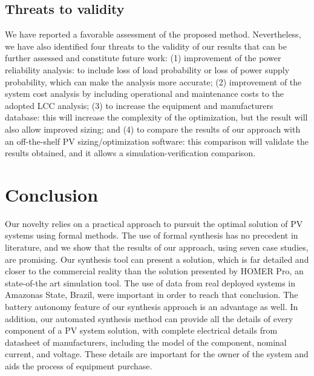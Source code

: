 \documentclass[runningheads]{llncs}
\begin{document}
\subsection{Threats to validity} 

We have reported a favorable assessment of the proposed method. Nevertheless, we have also identified four threats to the validity of our results that can be further assessed and constitute future work: (1) improvement of the power reliability analysis: to include loss of load probability or loss of power supply probability, which can make the analysis more accurate; (2) improvement of the system cost analysis by including operational and maintenance costs to the adopted LCC analysis; (3) to increase the equipment and manufacturers database: this will increase the complexity of the optimization, but the result will also allow improved sizing; and (4) to compare the results of our approach with an off-the-shelf PV sizing/optimization software: this comparison will validate the results obtained, and it allows a simulation-verification comparison.

\section{Conclusion} 

Our novelty relies on a practical approach to pursuit the optimal solution of PV systems using formal methods. The use of formal synthesis has no precedent in literature, and we show that the results of our approach, using seven case studies, are promising.
Our synthesis tool can present a solution, which is far detailed and closer to the commercial reality than the solution presented by HOMER Pro, an state-of-the art simulation tool. The use of data from real deployed systems in Amazonas State, Brazil, were important in order to reach that conclusion. The battery autonomy feature of our synthesis approach is an advantage as well. In addition, our automated synthesis method can provide all the details of every component of a PV system solution, with complete electrical details from datasheet of manufacturers, including the model of the component, nominal current, and voltage. These details are important for the owner of the system and aids the process of equipment purchase.
%
%


%
\end{document}
